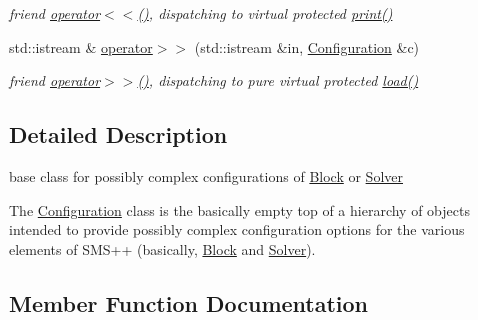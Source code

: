 \begin{DoxyCompactItemize}
\begin{DoxyCompactList}\small\item\em friend \mbox{\hyperlink{class_s_m_spp__di__unipi__it_1_1_configuration_ad9926988904739fe7789505dc5292685}{operator$<$$<$()}}, dispatching to virtual protected \mbox{\hyperlink{class_s_m_spp__di__unipi__it_1_1_configuration_a2e7b9c9148a98c5c342e8c25cac95926}{print()}} \end{DoxyCompactList}\item 
std\+::istream \& \mbox{\hyperlink{class_s_m_spp__di__unipi__it_1_1_configuration_a670faf8496c014b1c605559fca07429b}{operator$>$$>$}} (std\+::istream \&in, \mbox{\hyperlink{class_s_m_spp__di__unipi__it_1_1_configuration}{Configuration}} \&c)
\begin{DoxyCompactList}\small\item\em friend \mbox{\hyperlink{class_s_m_spp__di__unipi__it_1_1_configuration_a670faf8496c014b1c605559fca07429b}{operator$>$$>$()}}, dispatching to {\itshape pure} virtual protected \mbox{\hyperlink{class_s_m_spp__di__unipi__it_1_1_configuration_a27ae9e4279482d52342c7958c34a43c6}{load()}} \end{DoxyCompactList}\end{DoxyCompactItemize}


\subsection{Detailed Description}
base class for possibly complex configurations of \mbox{\hyperlink{class_s_m_spp__di__unipi__it_1_1_block}{Block}} or \mbox{\hyperlink{class_s_m_spp__di__unipi__it_1_1_solver}{Solver}} 

The \mbox{\hyperlink{class_s_m_spp__di__unipi__it_1_1_configuration}{Configuration}} class is the basically empty top of a hierarchy of objects intended to provide possibly complex configuration options for the various elements of S\+M\+S++ (basically, \mbox{\hyperlink{class_s_m_spp__di__unipi__it_1_1_block}{Block}} and \mbox{\hyperlink{class_s_m_spp__di__unipi__it_1_1_solver}{Solver}}). 

\subsection{Member Function Documentation}
\mbox{\label{class_s_m_spp__di__unipi__it_1_1_configuration_aa982da3f095d1a857dc95d53ac335700}} 
